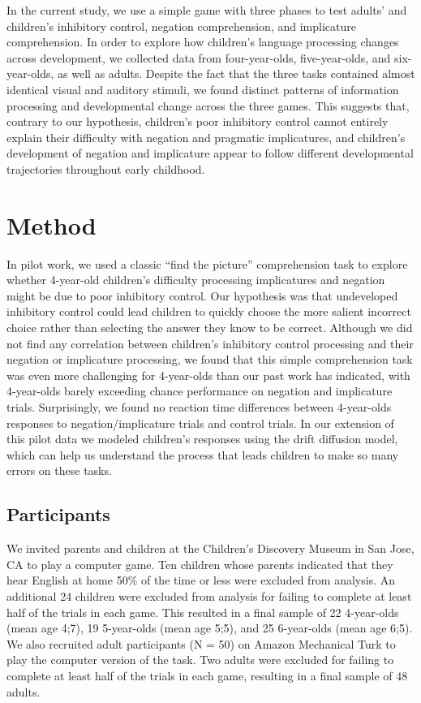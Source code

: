 \documentclass[10pt,letterpaper]{article}
\begin{document}
In the current study, we use a simple game with three phases to test adults' and children's inhibitory control, negation comprehension, and implicature comprehension.  In order to explore how children's language processing changes across development, we collected data from four-year-olds, five-year-olds, and six-year-olds, as well as adults.  Despite the fact that the three tasks contained almost identical visual and auditory stimuli, we found distinct patterns of information processing and developmental change across the three games.  This suggests that, contrary to our hypothesis, children's poor inhibitory control cannot entirely explain their difficulty with negation and pragmatic implicatures, and children's development of negation and implicature appear to follow different developmental trajectories throughout early childhood. 

\section{Method}

In pilot work, we used a classic ``find the picture'' comprehension task to explore whether 4-year-old children's difficulty processing implicatures and negation might be due to poor inhibitory control.  Our hypothesis was that undeveloped inhibitory control could lead children to quickly choose the more salient incorrect choice rather than selecting the answer they know to be correct.  Although we did not find any correlation between children's inhibitory control processing and their negation or implicature processing, we found that this simple comprehension task was even more challenging for 4-year-olds than our past work has indicated, with 4-year-olds barely exceeding chance performance on negation and implicature trials.  Surprisingly, we found no reaction time differences between 4-year-olds responses to negation/implicature trials and control trials. In our extension of this pilot data we modeled children's responses using the drift diffusion model, which can help us understand the process that leads children to make so many errors on these tasks.  

\subsection{Participants}

We invited parents and children at the Children's Discovery Museum in San Jose, CA to play a computer game.  Ten children whose parents indicated that they hear English at home 50\% of the time or less were excluded from analysis.  An additional 24 children were excluded from analysis for failing to complete at least half of the trials in each game.  This resulted in a final sample of 22 4-year-olds (mean age 4;7), 19 5-year-olds (mean age 5;5), and 25 6-year-olds (mean age 6;5).  We also recruited adult participants (N = 50) on Amazon Mechanical Turk to play the computer version of the task.  Two adults were excluded for failing to complete at least half of the trials in each game, resulting in a final sample of 48 adults.  
\end{document}
